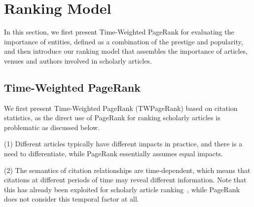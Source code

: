\section{Ranking Model}
\label{sec-model}

In this section, we first present Time-Weighted PageRank for evaluating  the importance of entities, defined as a combination of the prestige and popularity, and then introduce our ranking model \ensemblerank that assembles the importance of articles, venues and authors involved in scholarly articles.



\subsection{Time-Weighted PageRank}
\label{subsec-twpr}

We first present Time-Weighted PageRank (TWPageRank) based on citation statistics, as the direct use of PageRank for ranking scholarly articles is problematic as discussed below.







\noindent(1) Different articles typically have different impacts in practice, and there is a need to differentiate, while PageRank essentially assumes equal impacts.


\noindent(2) The semantics of citation relationships are time-dependent, which means that citations at different periods of time may reveal different information. Note that this has already been exploited for scholarly article ranking~\cite{Li08TSRanking,Wang13AAAI,WalkerXKM07}, while PageRank does not consider this temporal factor at all.

